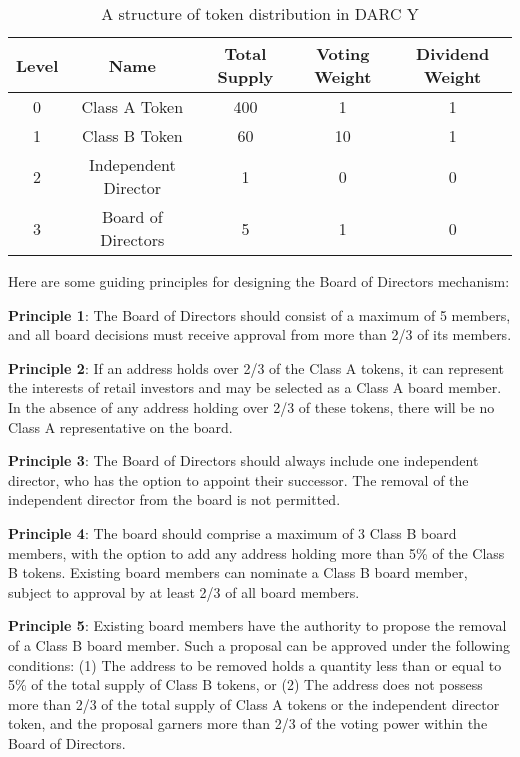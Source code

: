 \documentclass[main.tex]{subfiles}
\begin{document}
\begin{table}[h!]
\centering
\begin{tabular}{||c c c c c||} 
 \hline
 Level & Name & Total Supply & Voting Weight & Dividend Weight \\ [0.5ex] 
 \hline\hline

 0 & Class A Token & 400 & 1 & 1 \\
 1 & Class B Token & 60 & 10 & 1 \\
 2 & Independent Director & 1 & 0 & 0 \\
 3 & Board of Directors & 5 & 1 & 0 \\
 \hline
\end{tabular}
\caption{A structure of token distribution in DARC Y}
\label{table:3}
\end{table}


Here are some guiding principles for designing the Board of Directors mechanism:

\textbf{Principle 1}: The Board of Directors should consist of a maximum of 5 members, and all board decisions must receive approval from more than 2/3 of its members.

\textbf{Principle 2}: If an address holds over 2/3 of the Class A tokens, it can represent the interests of retail investors and may be selected as a Class A board member. In the absence of any address holding over 2/3 of these tokens, there will be no Class A representative on the board.

\textbf{Principle 3}: The Board of Directors should always include one independent director, who has the option to appoint their successor. The removal of the independent director from the board is not permitted.

\textbf{Principle 4}: The board should comprise a maximum of 3 Class B board members, with the option to add any address holding more than 5\% of the Class B tokens. Existing board members can nominate a Class B board member, subject to approval by at least 2/3 of all board members.

\textbf{Principle 5}: Existing board members have the authority to propose the removal of a Class B board member. Such a proposal can be approved under the following conditions: (1) The address to be removed holds a quantity less than or equal to 5\% of the total supply of Class B tokens, or (2) The address does not possess more than 2/3 of the total supply of Class A tokens or the independent director token, and the proposal garners more than 2/3 of the voting power within the Board of Directors.
\end{document}
